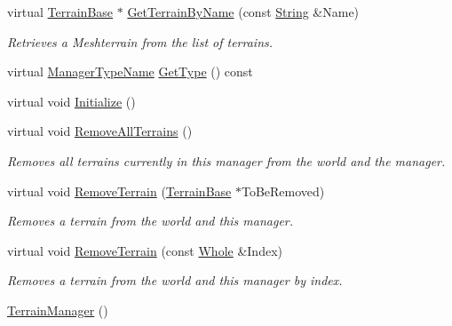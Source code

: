 \begin{DoxyCompactItemize}
virtual \hyperlink{classMezzanine_1_1TerrainBase}{TerrainBase} $\ast$ \hyperlink{classMezzanine_1_1TerrainManager_aa582965012dc57bd39b01d6dc8773642}{GetTerrainByName} (const \hyperlink{namespaceMezzanine_acf9fcc130e6ebf08e3d8491aebcf1c86}{String} \&Name)
\begin{DoxyCompactList}\small\item\em Retrieves a Meshterrain from the list of terrains. \item\end{DoxyCompactList}\item 
virtual \hyperlink{classMezzanine_1_1ManagerBase_a08cecf5169cad3e82be81a3a159b0b6e}{ManagerTypeName} \hyperlink{classMezzanine_1_1TerrainManager_a86fbb914cfbc0de3dc555d670bb35107}{GetType} () const 
\item 
virtual void \hyperlink{classMezzanine_1_1TerrainManager_abe9550c9c6565bbd0610dcaa20eedc0c}{Initialize} ()
\item 
virtual void \hyperlink{classMezzanine_1_1TerrainManager_ae940f33a369e54c2322de4202d236eb2}{RemoveAllTerrains} ()
\begin{DoxyCompactList}\small\item\em Removes all terrains currently in this manager from the world and the manager. \item\end{DoxyCompactList}\item 
virtual void \hyperlink{classMezzanine_1_1TerrainManager_ae304121e1f5023bb76cfda962d860395}{RemoveTerrain} (\hyperlink{classMezzanine_1_1TerrainBase}{TerrainBase} $\ast$ToBeRemoved)
\begin{DoxyCompactList}\small\item\em Removes a terrain from the world and this manager. \item\end{DoxyCompactList}\item 
virtual void \hyperlink{classMezzanine_1_1TerrainManager_abd5fec432a277253d08c5c7a462f3cd6}{RemoveTerrain} (const \hyperlink{namespaceMezzanine_adcbb6ce6d1eb4379d109e51171e2e493}{Whole} \&Index)
\begin{DoxyCompactList}\small\item\em Removes a terrain from the world and this manager by index. \item\end{DoxyCompactList}\item 
\hypertarget{classMezzanine_1_1TerrainManager_acc5ec25398260bc73cbb3c6d206f76d6}{
\hyperlink{classMezzanine_1_1TerrainManager_acc5ec25398260bc73cbb3c6d206f76d6}{TerrainManager} ()}
\label{classMezzanine_1_1TerrainManager_acc5ec25398260bc73cbb3c6d206f76d6}


\end{DoxyCompactItemize}
